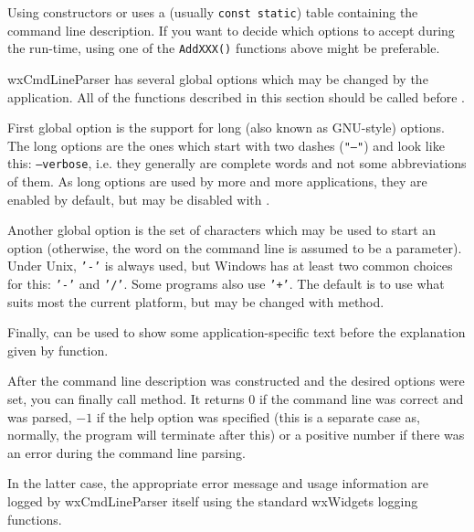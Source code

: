 Using constructors or  uses a (usually 
{\tt const static}) table containing the command line description. If you want
to decide which options to accept during the run-time, using one of the 
{\tt AddXXX()} functions above might be preferable.


\label{wxcmdlineparsercustomization}

wxCmdLineParser has several global options which may be changed by the
application. All of the functions described in this section should be called
before .

First global option is the support for long (also known as GNU-style) options.
The long options are the ones which start with two dashes ({\tt "--"}) and look
like this: {\tt --verbose}, i.e. they generally are complete words and not some
abbreviations of them. As long options are used by more and more applications,
they are enabled by default, but may be disabled with 
.

Another global option is the set of characters which may be used to start an
option (otherwise, the word on the command line is assumed to be a parameter).
Under Unix, {\tt '-'} is always used, but Windows has at least two common
choices for this: {\tt '-'} and {\tt '/'}. Some programs also use {\tt '+'}.
The default is to use what suits most the current platform, but may be changed
with  method.

Finally,  can be used to show some
application-specific text before the explanation given by 
 function.


\label{wxcmdlineparserparsing}

After the command line description was constructed and the desired options were
set, you can finally call  method.
It returns $0$ if the command line was correct and was parsed, $-1$ if the help
option was specified (this is a separate case as, normally, the program will
terminate after this) or a positive number if there was an error during the
command line parsing.

In the latter case, the appropriate error message and usage information are
logged by wxCmdLineParser itself using the standard wxWidgets logging functions.



